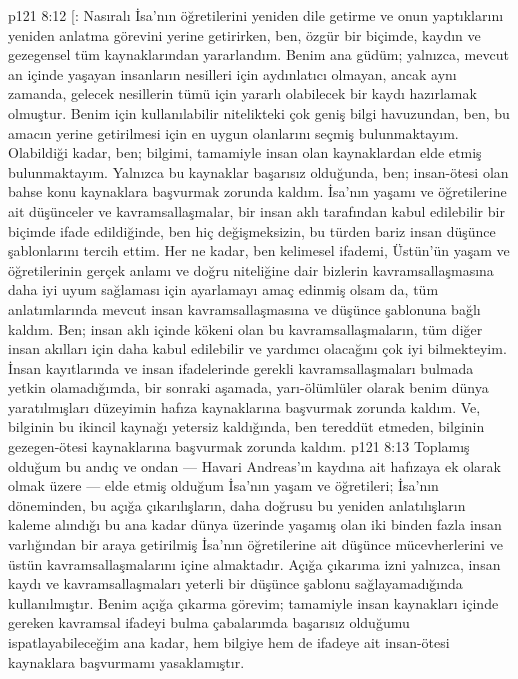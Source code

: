 \vs p121 8:12 [: Nasıralı İsa’nın öğretilerini yeniden dile getirme ve onun yaptıklarını yeniden anlatma görevini yerine getirirken, ben, özgür bir biçimde, kaydın ve gezegensel tüm kaynaklarından yararlandım. Benim ana güdüm; yalnızca, mevcut an içinde yaşayan insanların nesilleri için aydınlatıcı olmayan, ancak aynı zamanda, gelecek nesillerin tümü için yararlı olabilecek bir kaydı hazırlamak olmuştur. Benim için kullanılabilir nitelikteki çok geniş bilgi havuzundan, ben, bu amacın yerine getirilmesi için en uygun olanlarını seçmiş bulunmaktayım. Olabildiği kadar, ben; bilgimi, tamamiyle insan olan kaynaklardan elde etmiş bulunmaktayım. Yalnızca bu kaynaklar başarısız olduğunda, ben; insan\hyp{}ötesi olan bahse konu kaynaklara başvurmak zorunda kaldım. İsa’nın yaşamı ve öğretilerine ait düşünceler ve kavramsallaşmalar, bir insan aklı tarafından kabul edilebilir bir biçimde ifade edildiğinde, ben hiç değişmeksizin, bu türden bariz insan düşünce şablonlarını tercih ettim. Her ne kadar, ben kelimesel ifademi, Üstün’ün yaşam ve öğretilerinin gerçek anlamı ve doğru niteliğine dair bizlerin kavramsallaşmasına daha iyi uyum sağlaması için ayarlamayı amaç edinmiş olsam da, tüm anlatımlarında mevcut insan kavramsallaşmasına ve düşünce şablonuna bağlı kaldım. Ben; insan aklı içinde kökeni olan bu kavramsallaşmaların, tüm diğer insan akılları için daha kabul edilebilir ve yardımcı olacağını çok iyi bilmekteyim. İnsan kayıtlarında ve insan ifadelerinde gerekli kavramsallaşmaları bulmada yetkin olamadığımda, bir sonraki aşamada, yarı\hyp{}ölümlüler olarak benim dünya yaratılmışları düzeyimin hafıza kaynaklarına başvurmak zorunda kaldım. Ve, bilginin bu ikincil kaynağı yetersiz kaldığında, ben tereddüt etmeden, bilginin gezegen\hyp{}ötesi kaynaklarına başvurmak zorunda kaldım.
\vs p121 8:13 Toplamış olduğum bu andıç ve ondan --- Havari Andreas’ın kaydına ait hafızaya ek olarak olmak üzere --- elde etmiş olduğum İsa’nın yaşam ve öğretileri; İsa’nın döneminden, bu açığa çıkarılışların, daha doğrusu bu yeniden anlatılışların kaleme alındığı bu ana kadar dünya üzerinde yaşamış olan iki binden fazla insan varlığından bir araya getirilmiş İsa’nın öğretilerine ait düşünce mücevherlerini ve üstün kavramsallaşmalarını içine almaktadır. Açığa çıkarıma izni yalnızca, insan kaydı ve kavramsallaşmaları yeterli bir düşünce şablonu sağlayamadığında kullanılmıştır. Benim açığa çıkarma görevim; tamamiyle insan kaynakları içinde gereken kavramsal ifadeyi bulma çabalarımda başarısız olduğumu ispatlayabileceğim ana kadar, hem bilgiye hem de ifadeye ait insan\hyp{}ötesi kaynaklara başvurmamı yasaklamıştır.
